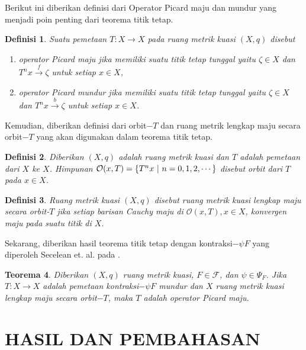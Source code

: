 \documentclass[journal]{IEEEtran}
\newtheorem{defn}{Definisi}[section]
\newtheorem{teo}[defn]{Teorema}
\theoremstyle{definition}
\theoremstyle{definition}
\theoremstyle{plain}
\begin{document}
Berikut ini diberikan definisi dari Operator Picard maju dan mundur yang menjadi poin penting dari teorema titik tetap.
\begin{defn}\label{operatorpicardkuasi}
    \cite{Secelean2019} Suatu pemetaan $T:X\rightarrow X$ pada ruang metrik kuasi $(X,q)$ disebut 
    \begin{enumerate}
        \item[(i)] operator Picard maju jika memiliki suatu titik tetap tunggal yaitu $\zeta\in X$ dan $T^n x\xrightarrow{f} \zeta$ untuk setiap $x\in X$,
        \item[(ii)] operator Picard mundur jika memiliki suatu titik tetap tunggal yaitu $\zeta\in X$ dan $T^n x\xrightarrow{b} \zeta$ untuk setiap $x\in X$.
    \end{enumerate}
\end{defn}

Kemudian, diberikan definisi dari orbit$-T$ dan ruang metrik lengkap maju secara orbit$-T$ yang akan digunakan dalam teorema titik tetap.
\begin{defn}\label{def:orbitT}
    \cite{SHATANAWI2012520} Diberikan $(X,q)$ adalah ruang metrik kuasi dan $T$ adalah pemetaan dari $X$ ke $X$. Himpunan $\mathcal{O}(x,T)=\qty{T^n x~|~n=0,1,2,\cdots}$ disebut orbit dari $T$ pada $x\in X$.
\end{defn}
\begin{defn}\label{def:lengkapmajuorbitT}
    \cite{SHATANAWI2012520} Ruang metrik kuasi $(X,q)$ disebut ruang metrik kuasi lengkap maju secara orbit-$T$ jika setiap barisan Cauchy maju di $\mathcal{O}(x,T), x\in X$, konvergen maju pada suatu titik di $X$.
\end{defn}

Sekarang, diberikan hasil teorema titik tetap dengan kontraksi$-\psi F$ yang diperoleh Secelean et. al. pada \cite{Secelean2019}. 
\begin{teo}\label{teoremaopm}
    \cite{Secelean2019} Diberikan $(X,q)$ ruang metrik kuasi, $F\in \mathcal{F}$, dan $\psi \in \Psi_F$. Jika $T:X\rightarrow X$ adalah pemetaan kontraksi$-\psi F$ mundur dan $X$ ruang metrik kuasi lengkap maju secara orbit$-T$, maka $T$ adalah operator Picard maju.
\end{teo}


    \section{HASIL DAN PEMBAHASAN}
\end{document}
